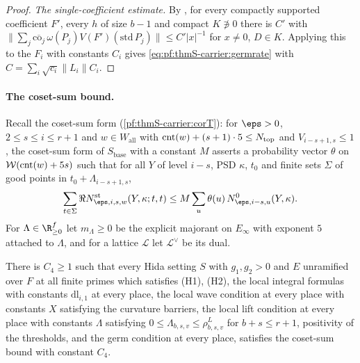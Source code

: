 \begin{proof}
\emph{The single-coefficient estimate.} By , for every compactly
supported coefficient $F'$, every $h$ of size $b-1$ and compact $K\not\ni0$ there is $C'$ with
$\|\sum_j\overline{\mathrm{co}_j}\,\omega(P_j)V(F')(\mathrm{std}\,P_j)\|\le C'|x|^{-1}$ for $x\ne0$, $D\in K$. Applying this to
the $F_i$ with constants $C_i$ gives \eqref{eq:pf:thmS-carrier:germrate} with $C=\sum_i\sqrt{c_i}\|L_i\|C_i$.
\end{proof}

\paragraph{The coset-sum bound.}
Recall the coset-sum form (\cref{pf:thmS-carrier:corT}): for $\eps>0$, $2\le s\le i\le r+1$ and $w\in W_{\mathrm{all}}$ with
$\operatorname{cnt}(w)+(s+1)\cdot5\le N_{\mathrm{top}}$ and $V_{i-s+1,s}\le1$, the coset-sum form of $S_{\mathrm{base}}$ with a
constant $M$ asserts a probability vector $\theta$ on $\mathcal{W}(\operatorname{cnt}(w)+5s)$ such that for all $Y$ of level
$i-s$, PSD $\kappa$, $t_0$ and finite sets $\Sigma$ of good points in $t_0+\Lambda_{i-s+1,s}$,
\[
\sum_{t\in\Sigma}\Re\thmScarrierNst_{\eps,i,s,w}(Y,\kappa;t,t)\le M\sum_u\theta(u)\,\thmScarrierNz_{\eps,i-s,u}(Y,\kappa).
\]
For $\Lambda\in\R^f_{\ge0}$ let $m_\Lambda\ge0$ be the explicit majorant on $E_\infty$ with exponent $5$ attached to
$\Lambda$, and for a lattice $\mathcal L$ let $\mathcal L^\vee$ be its dual.

\begin{theorem}\label{pf:thmS-carrier:sumform}
There is $C_4\ge1$ such that every Hida setting $S$ with $g_1,g_2>0$ and $E$ unramified over $F$ at all finite primes which
satisfies (H1), (H2), the local integral formulas with constants $\mathrm{dl}_{i,1}$ at every place, the local wave condition at
every place with constants $X$ satisfying the curvature barriers, the local lift condition at every place with constants
$\Lambda$ satisfying $0\le\Lambda_{b,s,v}\le\rho^L_{b,s,v}$ for $b+s\le r+1$, positivity of the thresholds, and the germ
condition at every place, satisfies the coset-sum bound with constant $C_4$.
\end{theorem}

